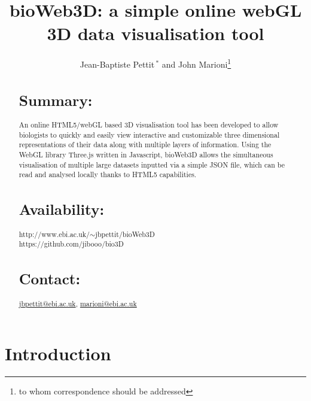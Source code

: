 \documentclass{bioinfo}
\begin{document}

\title[Application Note]{bioWeb3D: a simple online webGL 3D data visualisation tool}
\author[Pettit \textit{et~al}]{Jean-Baptiste Pettit\,$^{*}$ and John Marioni\footnote{to whom correspondence should be addressed}}
\address{EMBL-EBI, European Molecular Biology Laboratory - European Bioinformatics Institute, Cambridge, CB10 1SD, UK}



\maketitle

\begin{abstract}

\section{Summary:}
An online HTML5/webGL based 3D visualisation tool has been developed to allow biologists to quickly and easily view interactive and customizable three dimensional representations of their data along with multiple layers of information. Using the WebGL library Three.js written in Javascript, bioWeb3D allows the simultaneous visualisation of multiple large datasets inputted via a simple JSON file, which can be read and analysed locally thanks to HTML5 capabilities.

\section{Availability:}
http://www.ebi.ac.uk/$\sim$jbpettit/bioWeb3D \\ https://github.com/jibooo/bio3D

\section{Contact:} \href{jbpettit@ebi.ac.uk}{jbpettit@ebi.ac.uk}, \href{marioni@ebi.ac.uk}{marioni@ebi.ac.uk}
\end{abstract}

\section{Introduction}
\end{document}
